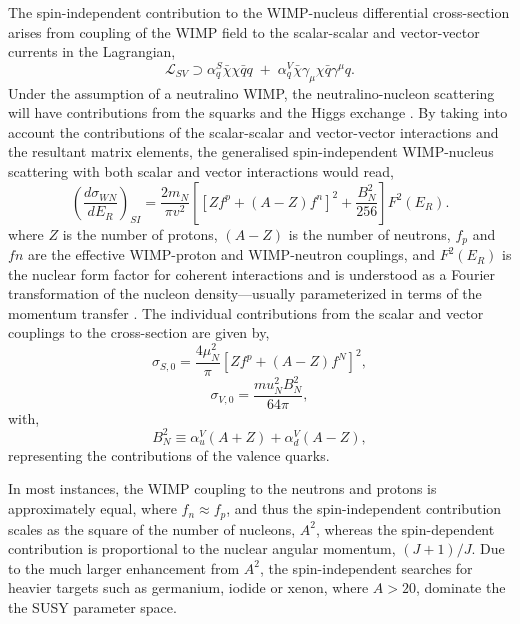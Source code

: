 {The spin-independent contribution to the WIMP-nucleus differential cross-section arises from coupling of the WIMP field to the scalar-scalar and vector-vector currents in the Lagrangian,
%
\begin{equation} \label{eq:scalar_vector_lag}
   \mathcal{L}_{SV} \supset \alpha^{S}_{q} \bar{\chi} \chi \bar{q}q \; + \; \alpha^{V}_{q} \bar{\chi} \gamma_{\mu} \chi \bar{q} \gamma^{\mu}q.
\end{equation}
%
Under the assumption of a neutralino WIMP, the neutralino-nucleon scattering will have contributions from the squarks and the Higgs exchange \cite{Jungman_1996}. By taking into account the contributions of the scalar-scalar and vector-vector interactions and the resultant matrix elements, the generalised spin-independent WIMP-nucleus scattering with both scalar and vector interactions would read,
%
\begin{equation} \label{eq:si_rate}
   	\left(\frac{d\sigma_{WN}}{dE_{R}}\right)_{SI} = \frac{2m_{N}}{\pi{}v^{2}}\left[[Zf^{p} + (A - Z)f^{n}]^2 + \frac{B^{2}_{N}}{256}\right] F^{2}(E_{R}).
\end{equation}
%
where $Z$ is the number of protons, $(A-Z)$ is the number of neutrons, $f_{p}$ and $f{n}$ are the effective WIMP-proton and WIMP-neutron couplings, and $F^2(E_{R})$ is the nuclear form factor for coherent interactions and is understood as a Fourier transformation of the nucleon density---usually parameterized in terms of the momentum transfer \cite{nuclear_form_wimp}. The individual contributions from the scalar and vector couplings to the cross-section are given by,
%
\begin{equation} \label{eq:scalar_vector_contributions}
   	\sigma_{S,0} = \frac{4\mu^{2}_{N}}{\pi}[Zf^{p} + (A-Z)f^{N}]^2,
\end{equation}
%
%
\begin{equation} \label{eq:scalar_vector_contributions}
   	\sigma_{V,0} = \frac{mu^{2}_{N}B^{2}_{N}}{64\pi},
\end{equation}
%
with,
%
\begin{equation} \label{eq:scalar_vector_contributions}
   	B^{2}_{N} \equiv \alpha^{V}_{u}(A+Z) + \alpha^{V}_{d}(A-Z),
\end{equation}
%
representing the contributions of the valence quarks.

In most instances, the WIMP coupling to the neutrons and protons is approximately equal, where $f_{n} \approx f_{p}$, and thus the spin-independent contribution scales as the square of the number of nucleons, $A^2$, whereas the spin-dependent contribution is proportional to the nuclear angular momentum, $(J+1)/J$. Due to the much larger enhancement from $A^2$, the spin-independent searches for heavier targets such as germanium, iodide or xenon, where $A>20$, dominate the the SUSY parameter space.

}
